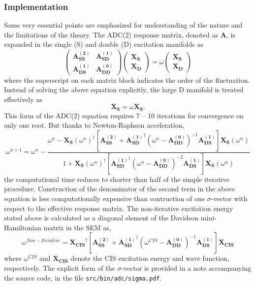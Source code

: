 \subsubsection{Implementation}
Some very essential points are emphasized for understanding of the
nature and the limitations of the theory. The ADC(2) response matrix,
denoted as $\mathbf{A}$, is expanded in the single (S) and double (D)
excitation manifolds as
\begin{equation*}
\begin{pmatrix}
\mathbf{A_{SS}^{(2)}} & \mathbf{A_{SD}^{(1)}}\\
\mathbf{A_{DS}^{(1)}} & \mathbf{A_{DD}^{(0)}}
\end{pmatrix}
\begin{pmatrix}
\mathbf{X_S}\\
\mathbf{X_D}
\end{pmatrix}
=\omega
\begin{pmatrix}
\mathbf{X_S}\\
\mathbf{X_D}
\end{pmatrix}
\end{equation*}
where the superscript on each matrix block indicates the order of
the fluctuation. Instead of solving the above equation explicitly,
the large D manifold is treated effectively as
\begin{equation*}
[\mathbf{A_{SS}^{(2)}}+\mathbf{A_{SD}^{(1)}}^{\dagger}(\omega-\mathbf{A_{DD}^{(0)}})^{-1}\mathbf{A_{DS}^{(1)}}]\mathbf{X_{S}}=\omega\mathbf{X_{S}}.
\end{equation*}
This form of the ADC(2) equation requires 7 -- 10 iterations for
convergence on only one root. But thanks to Newton-Raphson
acceleration,
\begin{equation*}
\omega^{n+1}=\omega^{n}-\frac{\omega^n-\mathbf{X_{S}}(\omega^n)^{\dagger}[\mathbf{A_{SS}^{(2)}}+\mathbf{A_{SD}^{(1)}}^{\dagger}(\omega^n-\mathbf{A_{DD}^{(0)}})^{-1}\mathbf{A_{DS}^{(1)}}]\mathbf{X_{S}}(\omega^n)}{1+\mathbf{X_{S}}(\omega^n)^{\dagger}[\mathbf{A_{SD}^{(1)}}^{\dagger}(\omega^n-\mathbf{A_{DD}^{(0)}})^{-2}\mathbf{A_{DS}^{(1)}}]\mathbf{X_{S}}(\omega^n)}
\end{equation*}
the computational time reduces to shorter than half of the simple iterative
procedure. Construction of the denominator of the second term in the above
equation is less computationally expensive than contruction of one $\sigma$-vector with respect to the effective response matrix. The non-iterative excitation energy stated above is calculated as a diagonal element of the Davidson mini-Hamiltonian matrix in the SEM as,
\begin{equation*}
\omega^{Non-Iterative}=\mathbf{X_{CIS}}^{\dagger}[\mathbf{A_{SS}^{(2)}}+\mathbf{A_{SD}^{(1)}}^{\dagger}(\omega^{CIS}-\mathbf{A_{DD}^{(0)}})^{-1}\mathbf{A_{DS}^{(1)}}]\mathbf{X_{CIS}}
\end{equation*}
where $\omega^{CIS}$ and $\mathbf{X_{CIS}}$ denote the CIS excitation
energy and wave function, respectively. The explicit form of the 
$\sigma$-vector is provided in a note accompanying the source code,
in the file {\tt src/bin/adc/sigma.pdf}. 

